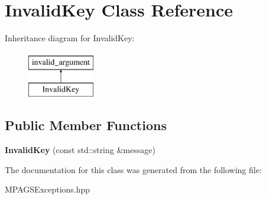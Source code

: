 \hypertarget{class_invalid_key}{}\section{Invalid\+Key Class Reference}
\label{class_invalid_key}
Inheritance diagram for Invalid\+Key\+:\begin{figure}[H]
\begin{center}
\leavevmode
\includegraphics[height=2.000000cm]{class_invalid_key}
\end{center}
\end{figure}
\subsection*{Public Member Functions}
\begin{DoxyCompactItemize}
\item 
{\bfseries Invalid\+Key} (const std\+::string \&message)\hypertarget{class_invalid_key_a0b3717945958a1fbe0ff504fa6212c92}{}\label{class_invalid_key_a0b3717945958a1fbe0ff504fa6212c92}

\end{DoxyCompactItemize}


The documentation for this class was generated from the following file\+:\begin{DoxyCompactItemize}
\item 
M\+P\+A\+G\+S\+Exceptions.\+hpp\end{DoxyCompactItemize}

